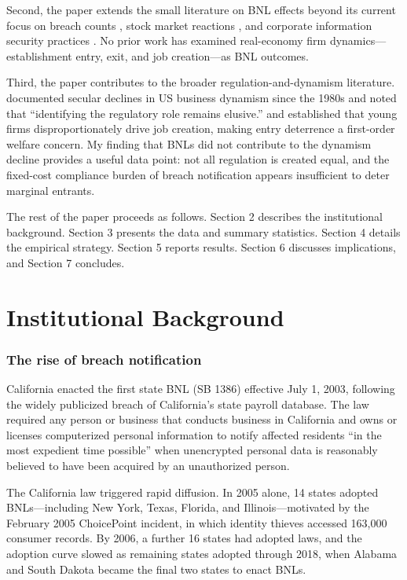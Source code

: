 \documentclass[12pt]{article}
\begin{document}
Second, the paper extends the small literature on BNL effects beyond its current focus on breach counts \citep{romanosky2011data}, stock market reactions \citep{acquisti2006privacy, li2024data}, and corporate information security practices \citep{campbell2015restricting}. No prior work has examined real-economy firm dynamics---establishment entry, exit, and job creation---as BNL outcomes.

Third, the paper contributes to the broader regulation-and-dynamism literature. \citet{decker2020changing} documented secular declines in US business dynamism since the 1980s and noted that ``identifying the regulatory role remains elusive.'' \citet{haltiwanger2013creates} and \citet{decker2014role} established that young firms disproportionately drive job creation, making entry deterrence a first-order welfare concern. My finding that BNLs did not contribute to the dynamism decline provides a useful data point: not all regulation is created equal, and the fixed-cost compliance burden of breach notification appears insufficient to deter marginal entrants.

The rest of the paper proceeds as follows. Section 2 describes the institutional background. Section 3 presents the data and summary statistics. Section 4 details the empirical strategy. Section 5 reports results. Section 6 discusses implications, and Section 7 concludes.


\section{Institutional Background}

\subsubsection*{The rise of breach notification} California enacted the first state BNL (SB 1386) effective July 1, 2003, following the widely publicized breach of California's state payroll database. The law required any person or business that conducts business in California and owns or licenses computerized personal information to notify affected residents ``in the most expedient time possible'' when unencrypted personal data is reasonably believed to have been acquired by an unauthorized person.

The California law triggered rapid diffusion. In 2005 alone, 14 states adopted BNLs---including New York, Texas, Florida, and Illinois---motivated by the February 2005 ChoicePoint incident, in which identity thieves accessed 163,000 consumer records. By 2006, a further 16 states had adopted laws, and the adoption curve slowed as remaining states adopted through 2018, when Alabama and South Dakota became the final two states to enact BNLs.
\end{document}
